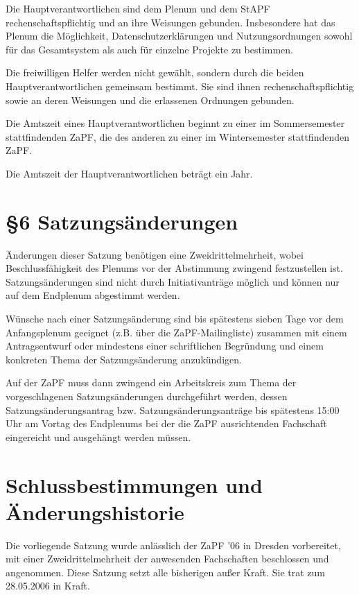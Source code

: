 \documentclass[12pt,oneside]{scrartcl}
\begin{document}
Die Hauptverantwortlichen sind dem Plenum und dem StAPF rechenschaftspflichtig
und an ihre Weisungen gebunden. Insbesondere hat das Plenum die Möglichkeit,
Datenschutzerklärungen und Nutzungsordnungen sowohl für das Gesamtsystem als
auch für einzelne Projekte zu bestimmen.

Die freiwilligen Helfer werden nicht gewählt, sondern durch die beiden
Hauptverantwortlichen gemeinsam bestimmt. Sie sind ihnen rechenschaftspflichtig
sowie an deren Weisungen und die erlassenen Ordnungen gebunden.

Die Amtszeit eines Hauptverantwortlichen beginnt zu einer im Sommersemester
stattfindenden ZaPF, die des anderen zu einer im Wintersemester stattfindenden
ZaPF.

Die Amtszeit der Hauptverantwortlichen beträgt ein Jahr.


\section{§6 Satzungsänderungen%
  \label{satzungsanderungen}%
}

Änderungen dieser Satzung benötigen eine Zweidrittelmehrheit, wobei Beschlussfähigkeit
des Plenums vor der Abstimmung zwingend festzustellen ist. Satzungsänderungen
sind nicht durch Initiativanträge möglich und können nur auf dem Endplenum
abgestimmt werden.

Wünsche nach einer Satzungsänderung sind bis spätestens sieben Tage vor dem
Anfangsplenum geeignet (z.B. über die ZaPF-Mailingliste)
zusammen mit einem Antragsentwurf oder mindestens einer schriftlichen
Begründung und einem konkreten Thema der Satzungsänderung anzukündigen.

Auf der ZaPF muss dann zwingend ein Arbeitskreis zum Thema der vorgeschlagenen
Satzungsänderungen durchgeführt werden, dessen Satzungsänderungsantrag bzw.
Satzungsänderungsanträge bis spätestens 15:00 Uhr am Vortag des Endplenums bei
der die ZaPF ausrichtenden Fachschaft eingereicht und ausgehängt werden müssen.


\section{Schlussbestimmungen und Änderungshistorie%
  \label{schlussbestimmungen-und-anderungshistorie}%
}

Die vorliegende Satzung wurde anlässlich der ZaPF '06 in Dresden vorbereitet,
mit einer Zweidrittelmehrheit der anwesenden Fachschaften beschlossen und
angenommen. Diese Satzung setzt alle bisherigen außer Kraft. Sie trat zum
28.05.2006 in Kraft.
\end{document}
